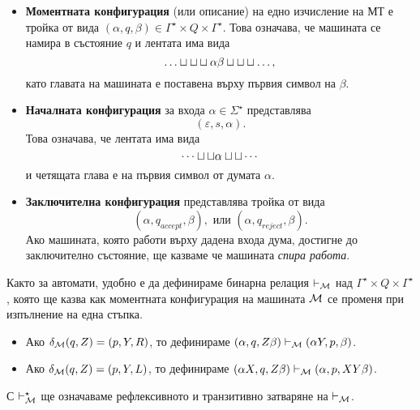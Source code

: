 \begin{itemize}
\item 
  {\bf Моментната конфигурация} (или описание) на едно изчисление на МТ е тройка от вида $(\alpha, q, \beta) \in \Gamma^\star\times Q \times \Gamma^\star$. Това означава, че
  машината се намира в състояние $q$ и лентата има вида
  \[\tape{\alpha\beta},\]
  като главата на машината е поставена върху първия символ на $\beta$.  
\item
  {\bf Началната конфигурация} за входа $\alpha \in \Sigma^\star$ представлява 
  \[(\varepsilon, s, \alpha).\]
  Това означава, че лентата има вида \[\cdots\sqcup\sqcup\alpha\sqcup\sqcup\cdots\]
  и четящата глава е на първия символ от думата $\alpha$.
\item
  {\bf Заключителна конфигурация} представлява тройка от вида
  \[(\alpha, q_{accept}, \beta), \text{ или }(\alpha, q_{reject}, \beta).\]
  Ако машината, която работи върху дадена входа дума, достигне до заключително състояние, ще казваме
  че машината {\em спира работа}.
\end{itemize}

Както за автомати, удобно е да дефинираме бинарна релация $\vdash_{\mathcal{M}}$ над $\Gamma^\star \times Q \times \Gamma^\star$,
която ще казва как моментната конфигурация на машината $\mathcal{M}$ се променя при изпълнение на една стъпка.
\begin{itemize}
\item
  Ако $\delta_{\mathcal{M}}(q,Z) = (p,Y,R)$, то дефинираме $(\alpha, q, Z\beta) \vdash_{\mathcal{M}} (\alpha Y, p, \beta)$.
\item 
  Ако $\delta_{\mathcal{M}}(q,Z) = (p,Y,L)$, то дефинираме $(\alpha X, q, Z\beta) \vdash_{\mathcal{M}} (\alpha , p, XY\beta)$.
  
\end{itemize}
С $\vdash^\star_{\mathcal{M}}$ ще означаваме рефлексивното и транзитивно затваряне на $\vdash_{\mathcal{M}}$.


